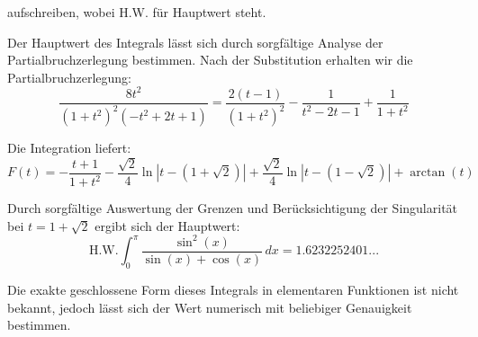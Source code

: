 \documentclass{article}
\begin{document}
aufschreiben, wobei H.W. für Hauptwert steht.

Der Hauptwert des Integrals lässt sich durch sorgfältige Analyse der Partialbruchzerlegung bestimmen. Nach der Substitution erhalten wir die Partialbruchzerlegung:
$$\frac{8t^2}{(1+t^2)^2(-t^2+2t+1)} = \frac{2(t-1)}{(1+t^2)^2} - \frac{1}{t^2-2t-1} + \frac{1}{1+t^2}$$

Die Integration liefert:
$$F(t) = -\frac{t+1}{1+t^2} - \frac{\sqrt{2}}{4}\ln|t-(1+\sqrt{2})| + \frac{\sqrt{2}}{4}\ln|t-(1-\sqrt{2})| + \arctan(t)$$

Durch sorgfältige Auswertung der Grenzen und Berücksichtigung der Singularität bei $t = 1+\sqrt{2}$ ergibt sich der Hauptwert:
$$\text{H.W.} \int_0^\pi \frac{\sin^2(x)}{\sin(x)+\cos(x)}\,dx = 1.6232252401...$$

Die exakte geschlossene Form dieses Integrals in elementaren Funktionen ist nicht bekannt, jedoch lässt sich der Wert numerisch mit beliebiger Genauigkeit bestimmen.
\end{document}
